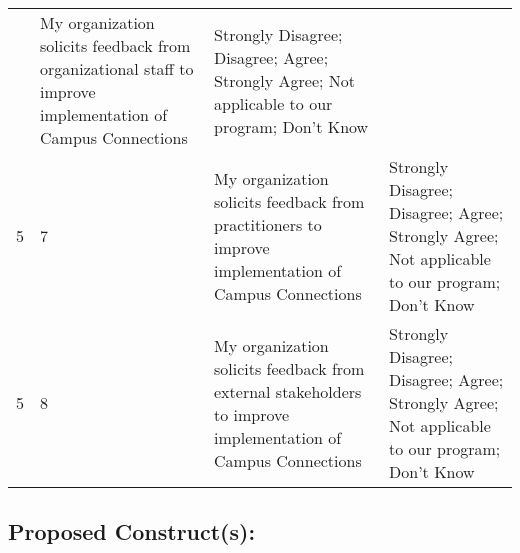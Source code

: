 \documentclass[]{article}
\begin{document}
\begin{longtable}[]{@{}llll@{}}
\begin{minipage}[t]{0.04\columnwidth}
\end{minipage} & \begin{minipage}[t]{0.40\columnwidth}\raggedright\strut
My organization solicits feedback from organizational staff to improve
implementation of Campus Connections\strut
\end{minipage} & \begin{minipage}[t]{0.40\columnwidth}\raggedright\strut
Strongly Disagree; Disagree; Agree; Strongly Agree; Not applicable to
our program; Don't Know\strut
\end{minipage}\tabularnewline
\begin{minipage}[t]{0.05\columnwidth}\raggedright\strut
5\strut
\end{minipage} & \begin{minipage}[t]{0.04\columnwidth}\raggedright\strut
7\strut
\end{minipage} & \begin{minipage}[t]{0.40\columnwidth}\raggedright\strut
My organization solicits feedback from practitioners to improve
implementation of Campus Connections\strut
\end{minipage} & \begin{minipage}[t]{0.40\columnwidth}\raggedright\strut
Strongly Disagree; Disagree; Agree; Strongly Agree; Not applicable to
our program; Don't Know\strut
\end{minipage}\tabularnewline
\begin{minipage}[t]{0.05\columnwidth}\raggedright\strut
5\strut
\end{minipage} & \begin{minipage}[t]{0.04\columnwidth}\raggedright\strut
8\strut
\end{minipage} & \begin{minipage}[t]{0.40\columnwidth}\raggedright\strut
My organization solicits feedback from external stakeholders to improve
implementation of Campus Connections\strut
\end{minipage} & \begin{minipage}[t]{0.40\columnwidth}\raggedright\strut
Strongly Disagree; Disagree; Agree; Strongly Agree; Not applicable to
our program; Don't Know\strut
\end{minipage}\tabularnewline
\bottomrule
\end{longtable}

\subsection{\texorpdfstring{\textbf{Proposed
Construct(s)}:}{Proposed Construct(s):}}\label{proposed-constructs-4}
\end{document}
